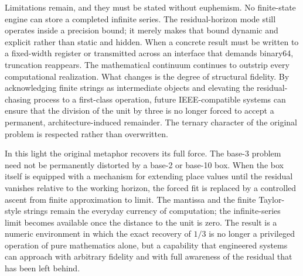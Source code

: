 Limitations remain, and they must be stated without euphemism. No finite-state engine can store a completed infinite series. The residual-horizon mode still operates inside a precision bound; it merely makes that bound dynamic and explicit rather than static and hidden. When a concrete result must be written to a fixed-width register or transmitted across an interface that demands binary64, truncation reappears. The mathematical continuum continues to outstrip every computational realization. What changes is the degree of structural fidelity. By acknowledging finite strings as intermediate objects and elevating the residual-chasing process to a first-class operation, future IEEE-compatible systems can ensure that the division of the unit by three is no longer forced to accept a permanent, architecture-induced remainder. The ternary character of the original problem is respected rather than overwritten.

In this light the original metaphor recovers its full force. The base-3 problem need not be permanently distorted by a base-2 or base-10 box. When the box itself is equipped with a mechanism for extending place values until the residual vanishes relative to the working horizon, the forced fit is replaced by a controlled ascent from finite approximation to limit. The mantissa and the finite Taylor-style strings remain the everyday currency of computation; the infinite-series limit becomes available once the distance to the unit is zero. The result is a numeric environment in which the exact recovery of \(1/3\) is no longer a privileged operation of pure mathematics alone, but a capability that engineered systems can approach with arbitrary fidelity and with full awareness of the residual that has been left behind.
